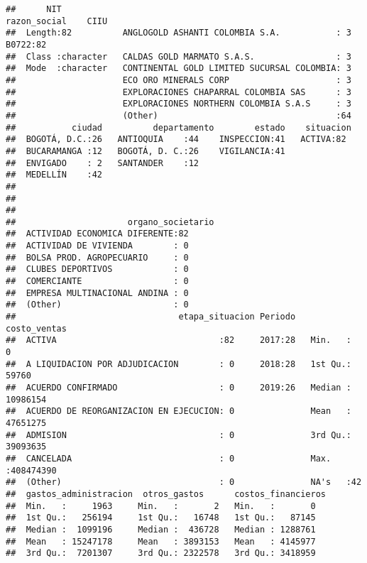 \documentclass[
  11pt,
]{article}
\begin{document}
\begin{verbatim}
##      NIT                                                razon_social    CIIU   
##  Length:82          ANGLOGOLD ASHANTI COLOMBIA S.A.           : 3    B0722:82  
##  Class :character   CALDAS GOLD MARMATO S.A.S.                : 3              
##  Mode  :character   CONTINENTAL GOLD LIMITED SUCURSAL COLOMBIA: 3              
##                     ECO ORO MINERALS CORP                     : 3              
##                     EXPLORACIONES CHAPARRAL COLOMBIA SAS      : 3              
##                     EXPLORACIONES NORTHERN COLOMBIA S.A.S     : 3              
##                     (Other)                                   :64              
##           ciudad          departamento        estado    situacion 
##  BOGOTÁ, D.C.:26   ANTIOQUIA    :44    INSPECCION:41   ACTIVA:82  
##  BUCARAMANGA :12   BOGOTÁ, D. C.:26    VIGILANCIA:41              
##  ENVIGADO    : 2   SANTANDER    :12                               
##  MEDELLÍN    :42                                                  
##                                                                   
##                                                                   
##                                                                   
##                      organo_societario
##  ACTIVIDAD ECONOMICA DIFERENTE:82     
##  ACTIVIDAD DE VIVIENDA        : 0     
##  BOLSA PROD. AGROPECUARIO     : 0     
##  CLUBES DEPORTIVOS            : 0     
##  COMERCIANTE                  : 0     
##  EMPRESA MULTINACIONAL ANDINA : 0     
##  (Other)                      : 0     
##                                etapa_situacion Periodo    costo_ventas      
##  ACTIVA                                :82     2017:28   Min.   :        0  
##  A LIQUIDACION POR ADJUDICACION        : 0     2018:28   1st Qu.:    59760  
##  ACUERDO CONFIRMADO                    : 0     2019:26   Median : 10986154  
##  ACUERDO DE REORGANIZACION EN EJECUCION: 0               Mean   : 47651275  
##  ADMISION                              : 0               3rd Qu.: 39093635  
##  CANCELADA                             : 0               Max.   :408474390  
##  (Other)                               : 0               NA's   :42         
##  gastos_administracion  otros_gastos      costos_financieros
##  Min.   :     1963     Min.   :       2   Min.   :       0  
##  1st Qu.:   256194     1st Qu.:   16748   1st Qu.:   87145  
##  Median :  1099196     Median :  436728   Median : 1288761  
##  Mean   : 15247178     Mean   : 3893153   Mean   : 4145977  
##  3rd Qu.:  7201307     3rd Qu.: 2322578   3rd Qu.: 3418959  

\end{verbatim}
\end{document}
